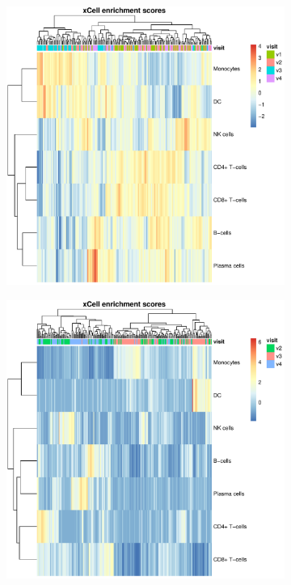 \begin{figure}
    \centering
    \begin{subfigure}[b]{0.65\textwidth}
        \centering
        \includegraphics[width=1.0\textwidth,page=10]{mainmatter/figures/chapter_03/get_xCell_estimates.dataset_array.plots.pdf}
    \end{subfigure}
    \bigskip\vfill
    \begin{subfigure}[b]{0.65\textwidth}
        \centering
        \includegraphics[width=1.0\textwidth,page=10]{mainmatter/figures/chapter_03/get_xCell_estimates.dataset_rnaseq.plots.pdf}

\end{subfigure}
\end{figure}
